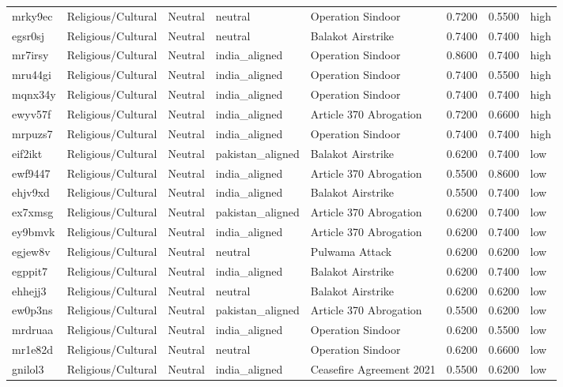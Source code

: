 \begin{longtable}{lllllrrl}
mrky9ec & Religious/Cultural & Neutral & neutral & Operation Sindoor & 0.7200 & 0.5500 & high \\
egsr0sj & Religious/Cultural & Neutral & neutral & Balakot Airstrike & 0.7400 & 0.7400 & high \\
mr7irsy & Religious/Cultural & Neutral & india\_aligned & Operation Sindoor & 0.8600 & 0.7400 & high \\
mru44gi & Religious/Cultural & Neutral & india\_aligned & Operation Sindoor & 0.7400 & 0.5500 & high \\
mqnx34y & Religious/Cultural & Neutral & india\_aligned & Operation Sindoor & 0.7400 & 0.7400 & high \\
ewyv57f & Religious/Cultural & Neutral & india\_aligned & Article 370 Abrogation & 0.7200 & 0.6600 & high \\
mrpuzs7 & Religious/Cultural & Neutral & india\_aligned & Operation Sindoor & 0.7400 & 0.7400 & high \\
eif2ikt & Religious/Cultural & Neutral & pakistan\_aligned & Balakot Airstrike & 0.6200 & 0.7400 & low \\
ewf9447 & Religious/Cultural & Neutral & india\_aligned & Article 370 Abrogation & 0.5500 & 0.8600 & low \\
ehjv9xd & Religious/Cultural & Neutral & india\_aligned & Balakot Airstrike & 0.5500 & 0.7400 & low \\
ex7xmsg & Religious/Cultural & Neutral & pakistan\_aligned & Article 370 Abrogation & 0.6200 & 0.7400 & low \\
ey9bmvk & Religious/Cultural & Neutral & india\_aligned & Article 370 Abrogation & 0.6200 & 0.7400 & low \\
egjew8v & Religious/Cultural & Neutral & neutral & Pulwama Attack & 0.6200 & 0.6200 & low \\
egppit7 & Religious/Cultural & Neutral & india\_aligned & Balakot Airstrike & 0.6200 & 0.7400 & low \\
ehhejj3 & Religious/Cultural & Neutral & neutral & Balakot Airstrike & 0.6200 & 0.6200 & low \\
ew0p3ns & Religious/Cultural & Neutral & pakistan\_aligned & Article 370 Abrogation & 0.5500 & 0.6200 & low \\
mrdruaa & Religious/Cultural & Neutral & india\_aligned & Operation Sindoor & 0.6200 & 0.5500 & low \\
mr1e82d & Religious/Cultural & Neutral & neutral & Operation Sindoor & 0.6200 & 0.6600 & low \\
gnilol3 & Religious/Cultural & Neutral & india\_aligned & Ceasefire Agreement 2021 & 0.5500 & 0.6200 & low \\

\end{longtable}
